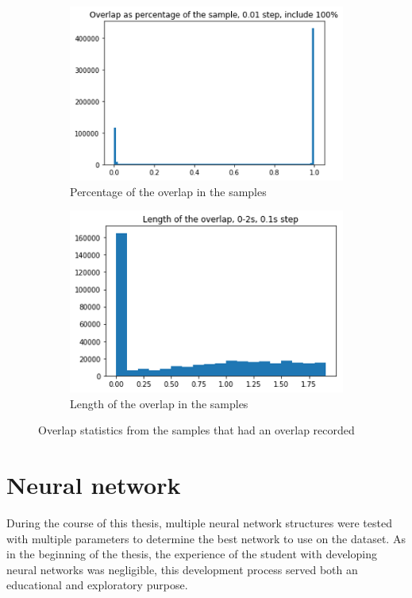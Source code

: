 \begin{figure}
    \centering
    \begin{subfigure}[b]{.45\textwidth}
        \centering
        \includegraphics[width=\textwidth]{figures/overlap0-100.png}
        \caption{Percentage of the overlap in the samples}
        \label{sfig:overlappercent}
    \end{subfigure}
    \hfill
    \begin{subfigure}[b]{.45\textwidth}
        \centering
        \includegraphics[width=\textwidth]{figures/length0-2.png}
        \caption{Length of the overlap in the samples}
        \label{sfig:overlaplength}
    \end{subfigure}
    \caption{Overlap statistics from the samples that had an overlap recorded}
    \label{fig:overlapstats}
\end{figure}

\section{Neural network}
During the course of this thesis, multiple neural network structures were tested with multiple parameters to determine the best network to use on the dataset.
As in the beginning of the thesis, the experience of the student with developing neural networks was negligible, this development process served both an educational and exploratory purpose.



